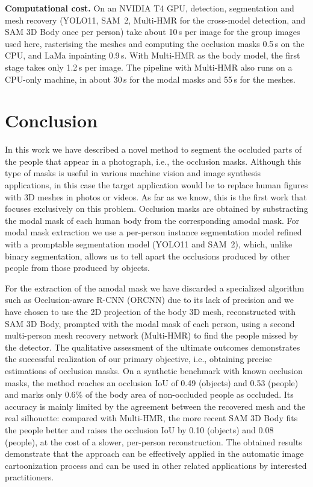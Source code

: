 \documentclass[11pt,a4paper]{article}
\begin{document}
\textbf{Computational cost.} On an NVIDIA T4 GPU, detection, segmentation and mesh recovery (YOLO11, SAM~2, Multi-HMR for the cross-model detection, and SAM 3D Body once per person) take about 10\,s per image for the group images used here, rasterising the meshes and computing the occlusion masks 0.5\,s on the CPU, and LaMa inpainting 0.9\,s. With Multi-HMR as the body model, the first stage takes only 1.2\,s per image. The pipeline with Multi-HMR also runs on a CPU-only machine, in about 30\,s for the modal masks and 55\,s for the meshes.

\section{Conclusion}

In this work we have described a novel method to segment the occluded parts of the people that appear in a photograph, i.e., the occlusion masks. Although this type of masks is useful in various machine vision and image synthesis applications, in this case the target application would be to replace human figures with 3D meshes in photos or videos. As far as we know, this is the first work that focuses exclusively on this problem. Occlusion masks are obtained by substracting the modal mask of each human body from the corresponding amodal mask. For modal mask extraction we use a per-person instance segmentation model refined with a promptable segmentation model (YOLO11 and SAM~2), which, unlike binary segmentation, allows us to tell apart the occlusions produced by other people from those produced by objects.

For the extraction of the amodal mask we have discarded a specialized algorithm such as Occlusion-aware R-CNN (ORCNN) due to its lack of precision and we have chosen to use the 2D projection of the body 3D mesh, reconstructed with SAM 3D Body, prompted with the modal mask of each person, using a second multi-person mesh recovery network (Multi-HMR) to find the people missed by the detector. The qualitative assessment of the ultimate outcomes demonstrates the successful realization of our primary objective, i.e., obtaining precise estimations of occlusion masks. On a synthetic benchmark with known occlusion masks, the method reaches an occlusion IoU of 0.49 (objects) and 0.53 (people) and marks only 0.6\% of the body area of non-occluded people as occluded. Its accuracy is mainly limited by the agreement between the recovered mesh and the real silhouette: compared with Multi-HMR, the more recent SAM 3D Body fits the people better and raises the occlusion IoU by 0.10 (objects) and 0.08 (people), at the cost of a slower, per-person reconstruction. The obtained results demonstrate that the approach can be effectively applied in the automatic image cartoonization process and can be used in other related applications by interested practitioners.
\end{document}
